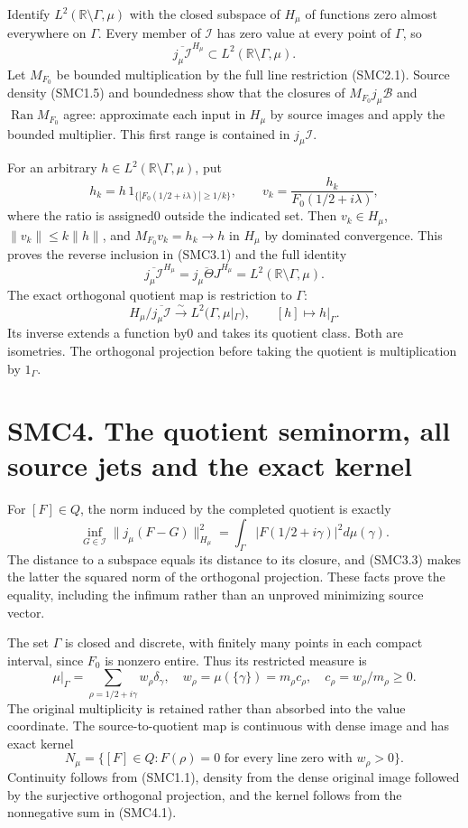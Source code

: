 Identify \(L^2(\mathbb R\setminus\Gamma,\mu)\) with the closed subspace
of \(H_\mu\) of functions zero almost everywhere on \(\Gamma\). Every
member of \(\mathcal I\) has zero value at every point of \(\Gamma\), so
\[
\overline{j_\mu\mathcal I}^{H_\mu}
\subset L^2(\mathbb R\setminus\Gamma,\mu).
\tag{SMC3.1}
\] Let \(M_{F_0}\) be bounded multiplication by the full line
restriction (SMC2.1). Source density (SMC1.5) and boundedness show that
the closures of \(M_{F_0}j_\mu\mathcal B\) and
\(\operatorname{Ran}M_{F_0}\) agree: approximate each input in \(H_\mu\)
by source images and apply the bounded multiplier. This first range is
contained in \(j_\mu\mathcal I\).

For an arbitrary \(h\in L^2(\mathbb R\setminus\Gamma,\mu)\), put \[
h_k=h\,1_{\{|F_0(1/2+i\lambda)|\ge1/k\}},\qquad
v_k=\frac{h_k}{F_0(1/2+i\lambda)},
\tag{SMC3.2}
\] where the ratio is assigned0 outside the indicated set. Then
\(v_k\in H_\mu\), \(\|v_k\|\le k\|h\|\), and \(M_{F_0}v_k=h_k\to h\) in
\(H_\mu\) by dominated convergence. This proves the reverse inclusion in
(SMC3.1) and the full identity \[
\boxed{\overline{j_\mu\mathcal I}^{H_\mu}
=\overline{j_\mu\Theta J}^{H_\mu}
=L^2(\mathbb R\setminus\Gamma,\mu).}
\tag{SMC3.3}
\] The exact orthogonal quotient map is restriction to \(\Gamma\): \[
H_\mu/\overline{j_\mu\mathcal I}
\xrightarrow{\sim}L^2(\Gamma,\mu|_\Gamma),
\qquad[h]\longmapsto h|_\Gamma.
\tag{SMC3.4}
\] Its inverse extends a function by0 and takes its quotient class. Both
are isometries. The orthogonal projection before taking the quotient is
multiplication by \(1_\Gamma\).

\section{SMC4. The quotient seminorm, all source jets and the exact
kernel}\label{smc4.-the-quotient-seminorm-all-source-jets-and-the-exact-kernel}

For \([F]\in Q\), the norm induced by the completed quotient is exactly
\[
\boxed{\inf_{G\in\mathcal I}\|j_\mu(F-G)\|_{H_\mu}^2
=\int_\Gamma|F(1/2+i\gamma)|^2d\mu(\gamma).}
\tag{SMC4.1}
\] The distance to a subspace equals its distance to its closure, and
(SMC3.3) makes the latter the squared norm of the orthogonal projection.
These facts prove the equality, including the infimum rather than an
unproved minimizing source vector.

The set \(\Gamma\) is closed and discrete, with finitely many points in
each compact interval, since \(F_0\) is nonzero entire. Thus its
restricted measure is \[
\mu|_\Gamma=\sum_{\rho=1/2+i\gamma}w_\rho\delta_\gamma,
\quad w_\rho=\mu(\{\gamma\})=m_\rho c_\rho,
\quad c_\rho=w_\rho/m_\rho\ge0.
\tag{SMC4.2}
\] The original multiplicity is retained rather than absorbed into the
value coordinate. The source-to-quotient map is continuous with dense
image and has exact kernel \[
N_\mu=\{[F]\in Q:F(\rho)=0
\text{ for every line zero with }w_\rho>0\}.
\tag{SMC4.3}
\] Continuity follows from (SMC1.1), density from the dense original
image followed by the surjective orthogonal projection, and the kernel
follows from the nonnegative sum in (SMC4.1).

